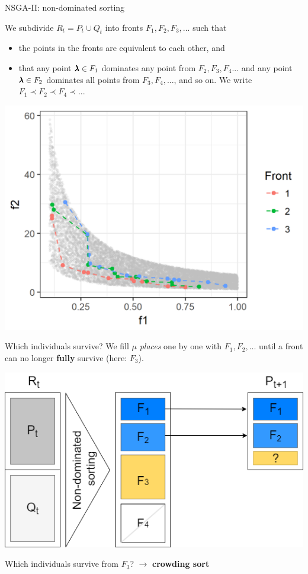 \begin{frame}[allowframebreaks]{NSGA-II: non-dominated sorting}



We subdivide $R_t = P_t \cup Q_t$ into fronts $F_1, F_2, F_3, ...$ such that

\begin{itemize}
\item the points in the fronts are equivalent to each other, and
\item that any point $\pmb{\lambda} \in F_1$ dominates any point from $F_2, F_3, F_4...$ and any point $\pmb{\lambda} \in F_2$ dominates all points from $F_3, F_4, ...$, and so on. We write $F_1 \prec F_2 \prec F_4 \prec ... $
\end{itemize}

\begin{center}
\includegraphics[width = 0.4\linewidth]{images/NSGA2_NDS.png}
\end{center}

\framebreak

Which individuals survive? We fill $\mu$ \textit{places} one by one with $F_1, F_2, ...$ until a front can no longer \textbf{fully} survive (here: $F_3$).

\begin{center}
\includegraphics[width = 0.45\linewidth]{images/NSGA2_2.png}
\end{center}

Which individuals survive from $F_3$? $\to$ \textbf{crowding sort}

\end{frame}

